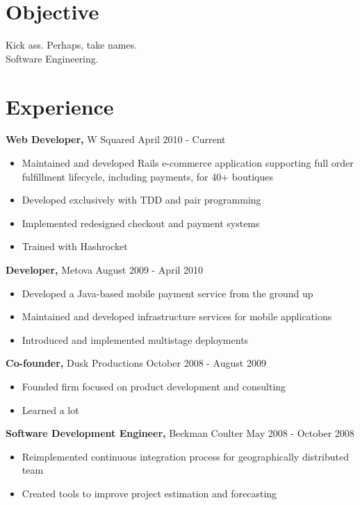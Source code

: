 \documentclass[line, margin, 10pt]{res}
\begin{document}
 

\renewcommand{\namefont}{ \LARGE \bf }

\address{elizabrock@gmail.com}
\address{(858) 205-9285}
 
\begin{resume} 
\section{Objective} 
Kick ass. Perhaps, take names. \\
Software Engineering.

\section{Experience}
 {\bf Web Developer,} W Squared \hfill April 2010 - Current
 \begin{itemize} \itemsep -2pt  %
 \item Maintained and developed Rails e-commerce application supporting full order fulfillment lifecycle, including payments, for 40+ boutiques
 \item Developed exclusively with TDD and pair programming
 \item Implemented redesigned checkout and payment systems
 \item Trained with Hashrocket
 \end{itemize}

 {\bf Developer,} Metova  \hfill August 2009 - April 2010
 \begin{itemize} \itemsep -2pt  %
 \item Developed a Java-based mobile payment service from the ground up
 \item Maintained and developed infrastructure services for mobile applications
 \item Introduced and implemented multistage deployments
 \end{itemize}

{\bf Co-founder,} Dusk Productions  \hfill  October 2008 - August 2009 
\begin{itemize} \itemsep -2pt %
\item Founded firm focused on product development and consulting
\item Learned a lot
\end{itemize}

{\bf Software Development Engineer,} Beckman Coulter \hfill May 2008 - October 2008
\begin{itemize} \itemsep -2pt %
\item Reimplemented continuous integration process for geographically distributed team
\item Created tools to improve project estimation and forecasting
\end{itemize}


\end{resume}
\end{document}
